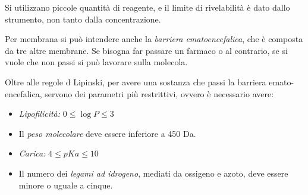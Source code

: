 
Si utilizzano piccole quantità di reagente, e il limite di rivelabilità
è dato dallo strumento, non tanto dalla concentrazione.

Per membrana si può intendere anche la \emph{barriera ematoencefalica}, che è
composta da tre altre membrane. Se bisogna far passare un farmaco o al
contrario, se si vuole che non passi si può lavorare sulla molecola.

Oltre alle regole d Lipinski, per avere una sostanza che passi la
barriera emato-encefalica, servono dei parametri più restrittivi, ovvero è necessario avere:
\begin{itemize}
  \item \emph{Lipofilicità:} $0 \leq{} \log{} P\leq{} 3$
  \item Il \emph{peso molecolare} deve essere inferiore a 450 Da.
  \item \emph{Carica:} $4 \leq pKa \leq 10$
  \item Il numero dei \emph{legami ad idrogeno}, mediati da ossigeno e azoto, deve essere minore o uguale a cinque.
\end{itemize}
